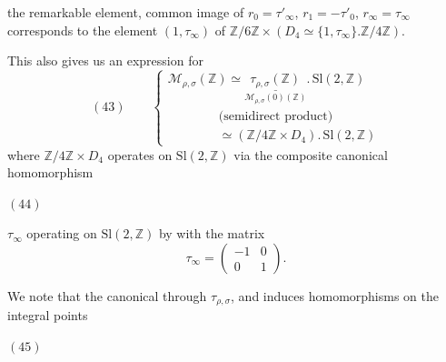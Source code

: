 
the remarkable element, common image of $r_0=\tau'_\infty$, $r_1=-\tau'_0$, $r_\infty=\tau_\infty$ corresponds to the element $(1,\tau_\infty)$ of $\mathbb Z/6\mathbb Z\times(D_4\simeq\{1,\tau_\infty\}.\mathbb Z/4\mathbb Z)$.

This also gives us an expression for 
\[
(43)\qquad
\left\{
\begin{array}{l}
\mathcal M_{\rho,\sigma}(\mathbb Z)\simeq
\underset{\mathcal M_{\rho,\sigma}(0)(\mathbb Z)}{\underline{\tau_{\rho,\sigma}(\mathbb Z)}}
.\,\mathrm{Sl}(2,\mathbb Z)\\[5pt]
\hspace{4em}\text{(semidirect product)}\\[5pt]
\hspace{4em}\simeq(\mathbb Z/4\mathbb Z\times D_4).\,\mathrm{Sl}(2,\mathbb Z)
\end{array}\right.
\]
where $\mathbb Z/4\mathbb Z\times D_4$ operates on $\mathrm{Sl}(2,\mathbb Z)$ via the composite canonical homomorphism

\noindent$(44)$\quad
{}

$\tau_\infty$ operating on $\mathrm{Sl}(2,\mathbb Z)$ by  with the matrix
\[
\tau_\infty=\begin{pmatrix}-1&0\\0&1\end{pmatrix}.
\]
\margin{!}

We note that the canonical 
 through  $\tau_{\rho,\sigma}$, and induces homomorphisms on the integral points

\noindent$(45)$\quad
{}

